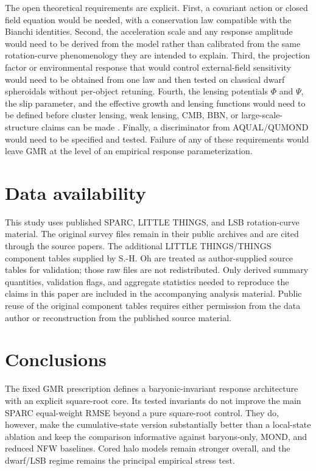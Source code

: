 ﻿\documentclass[twocolumn]{aastex631}
\begin{document}
The open theoretical requirements are explicit.  First, a covariant action or closed field equation would be needed, with a conservation law compatible with the Bianchi identities.  Second, the acceleration scale and any response amplitude would need to be derived from the model rather than calibrated from the same rotation-curve phenomenology they are intended to explain.  Third, the projection factor or environmental response that would control external-field sensitivity would need to be obtained from one law and then tested on classical dwarf spheroidals without per-object retuning.  Fourth, the lensing potentials $\Phi$ and $\Psi$, the slip parameter, and the effective growth and lensing functions would need to be defined before cluster lensing, weak lensing, CMB, BBN, or large-scale-structure claims can be made \citep{Markevitch2004,Clowe2006,Planck2018Cosmology}.  Finally, a discriminator from AQUAL/QUMOND would need to be specified and tested.  Failure of any of these requirements would leave GMR at the level of an empirical response parameterization.

\section{Data availability}

This study uses published SPARC, LITTLE THINGS, and LSB rotation-curve material.  The original survey files remain in their public archives and are cited through the source papers.  The additional LITTLE THINGS/THINGS component tables supplied by S.-H. Oh are treated as author-supplied source tables for validation; those raw files are not redistributed.  Only derived summary quantities, validation flags, and aggregate statistics needed to reproduce the claims in this paper are included in the accompanying analysis material.  Public reuse of the original component tables requires either permission from the data author or reconstruction from the published source material.


\section{Conclusions}

The fixed GMR prescription defines a baryonic-invariant response architecture with an explicit square-root core.  Its tested invariants do not improve the main SPARC equal-weight RMSE beyond a pure square-root control.  They do, however, make the cumulative-state version substantially better than a local-state ablation and keep the comparison informative against baryons-only, MOND, and reduced NFW baselines.  Cored halo models remain stronger overall, and the dwarf/LSB regime remains the principal empirical stress test.
\end{document}

